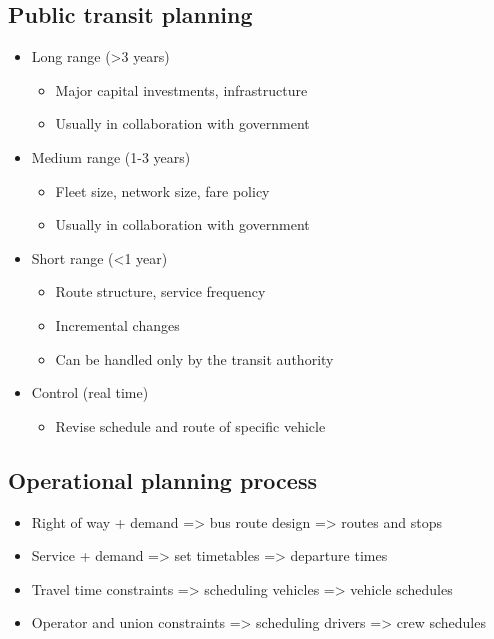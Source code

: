 \documentclass[11pt]{article}
\begin{document}
\subsection{Public transit planning}
\label{sec:org0b2e60c}
\begin{itemize}
\item Long range (>3 years)
\begin{itemize}
\item Major capital investments, infrastructure
\item Usually in collaboration with government
\end{itemize}
\item Medium range (1-3 years)
\begin{itemize}
\item Fleet size, network size, fare policy
\item Usually in collaboration with government
\end{itemize}
\item Short range (<1 year)
\begin{itemize}
\item Route structure, service frequency
\item Incremental changes
\item Can be handled only by the transit authority
\end{itemize}
\item Control (real time)
\begin{itemize}
\item Revise schedule and route of specific vehicle
\end{itemize}
\end{itemize}

\subsection{Operational planning process}
\label{sec:org56e932b}
\begin{itemize}
\item Right of way + demand => bus route design => routes and stops
\item Service + demand => set timetables => departure times
\item Travel time constraints => scheduling vehicles => vehicle schedules
\item Operator and union constraints => scheduling drivers => crew schedules
\end{itemize}
\end{document}
